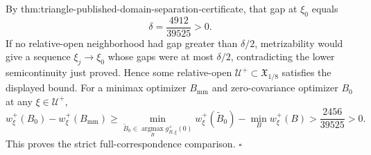 By thm:triangle-published-domain-separation-certificate, that gap at \(\xi_0\) equals
\[
 \delta=\frac{4912}{39525}>0.
\]
If no relative-open neighborhood had gap greater than \(\delta/2\), metrizability would give a sequence \(\xi_j\to\xi_0\) whose gaps were at most \(\delta/2\), contradicting the lower semicontinuity just proved.  Hence some relative-open \(\mathcal U^{+}\subset\mathfrak X_{1/8}\) satisfies the displayed bound.  For a minimax optimizer \(B_{\mathrm{mm}}\) and zero-covariance optimizer \(B_0\) at any \(\xi\in\mathcal U^{+}\),
\[
 w_\xi^{+}(B_0)-w_\xi^{+}(B_{\mathrm{mm}})
 \ge
 \min_{\widetilde B_0\in\operatorname*{argmax}_B g_{B,\xi}^{+}(0)}
 w_\xi^{+}(\widetilde B_0)-\min_Bw_\xi^{+}(B)
 >\frac{2456}{39525}>0.
\]
This proves the strict full-correspondence comparison. \(\square\)